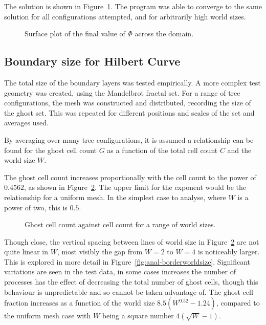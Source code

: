 \documentclass[twoside]{IIBproject}
\numberwithin{figure}{section}
\begin{document}
        The solution is shown in Figure~\ref{fig:pois-result}. The program was able to converge to the same solution for all configurations attempted, and for arbitrarily high world sizes. 

        \begin{figure}[!htbp]
            \centering
            
            \caption{Surface plot of the final value of $\Phi$ across the domain.}
            \label{fig:pois-result}
        \end{figure}



    \subsection{Boundary size for Hilbert Curve}
        \label{sec:results-boundarysize}

        The total size of the boundary layers was tested empirically. A more complex test geometry was created, using the Mandelbrot fractal set. For a range of tree configurations, the mesh was constructed and distributed, recording the size of the ghost set. This was repeated for different positions and scales of the set and averages used.

        By averaging over many tree configurations, it is assumed a relationship can be found for the ghost cell count $G$ as a function of the total cell count $C$ and the world size $W$.

        The ghost cell count increases proportionally with the cell count to the power of $0.4562$, as shown in Figure~\ref{fig:anal-scaling}. The upper limit for the exponent would be the relationship for a uniform mesh. In the simplest case to analyse, where $W$ is a power of two, this is $0.5$. 

        \tikzset{external/export next=false}
        \begin{figure}[!htbp]
            \centering
            
            \caption{Ghost cell count against cell count for a range of world sizes. }
            \label{fig:anal-scaling}
        \end{figure}

        Though close, the vertical spacing between lines of world size in Figure~\ref{fig:anal-scaling} are not quite linear in $W$, most visibly the gap from $W=2$ to $W=4$ is noticeably larger. This is explored in more detail in Figure~\ref{fig:anal-borderworldsize}. Significant variations are seen in the test data, in some cases increases the number of processes has the effect of decreasing the total number of ghost cells, though this behaviour is unpredictable and so cannot be taken advantage of. The ghost cell fraction increases as a function of the world size $8.5(W^{0.52}-1.24)$, compared to the uniform mesh case with $W$ being a square number $4(\sqrt{W} - 1)$. 
\end{document}
